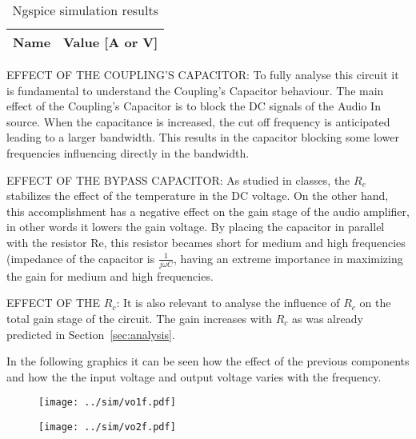 \begin{table}[!ht]
  \centering
  \begin{tabular}{|l|r|}
    \hline    
    {\bf Name} & {\bf Value [A or V]} \\ \hline
    
  \end{tabular}
  \caption{Ngspice simulation results}
  \label{tab:ng4}
\end{table}

\par EFFECT OF THE COUPLING'S CAPACITOR: To fully analyse this circuit it is fundamental to understand the Coupling's Capacitor behaviour. The main effect of the Coupling's Capacitor is to block the DC signals of the Audio In source. When the capacitance is increased, the cut off frequency is anticipated leading to a larger bandwidth. This results in the capacitor blocking some lower frequencies influencing directly in the bandwidth.

\par EFFECT OF THE BYPASS CAPACITOR: As studied in classes, the $R_e$ stabilizes the effect of the temperature in the DC voltage. On the other hand, this accomplishment has a negative effect on the gain stage of the audio amplifier, in other words it lowers the gain voltage. By placing the capacitor in parallel with the resistor Re, this resistor becames short for medium and high frequencies (impedance of the capacitor is $\frac{1}{j\omega C}$, having an extreme importance in maximizing the gain for medium and high frequencies.

\par EFFECT OF THE $R_c$: It is also relevant to analyse the influence of $R_c$ on the total gain stage of the circuit. The gain increases with $R_c$ as was already predicted in Section~\ref{sec:analysis}.

\par In the following graphics it can be seen how the effect of the previous components and how the the input voltage and output voltage varies with the frequency.

\begin{figure} [ht]
\centering
\begin{minipage}{.5\textwidth}
  \centering
  \texttt{[image: ../sim/vo1f.pdf]}
  \label{fig:sim41}
\end{minipage}%
\begin{minipage}{.5\textwidth}
  \centering
  \texttt{[image: ../sim/vo2f.pdf]}
  \label{fig:vout_env}
\end{minipage}
\end{figure}

